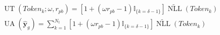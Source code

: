 ﻿\documentclass{article}
\begin{document}
\begin{preview}
\(\displaystyle
\begin{gathered}
  \operatorname{UT}(\mathit{Token}_k;\omega,r_{pb})
  =
  \left[1+(\omega r_{pb}-1)\mathbb{I}_{\{k=\delta-1\}}\right]
  \widetilde{\operatorname{NLL}}(\mathit{Token}_k) \\
  \operatorname{UA}(\hat{\bm y}_g)
  =
  \sum_{k=1}^{N_t}
  \left[1+(\omega r_{pb}-1)\mathbb{I}_{\{k=\delta-1\}}\right]
  \widetilde{\operatorname{NLL}}(\mathit{Token}_k)
\end{gathered}
\)
\end{preview}
\end{document}

